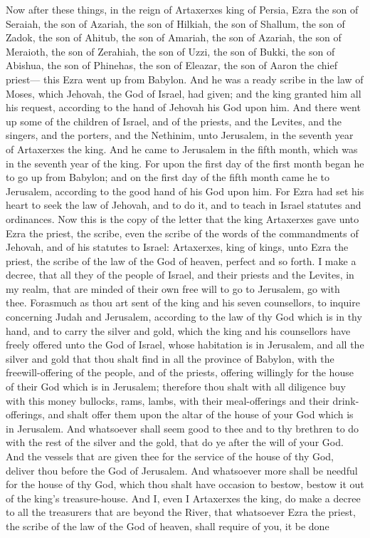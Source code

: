 Now after these things, in the reign of Artaxerxes king of Persia, Ezra the son of Seraiah, the son of Azariah, the son of Hilkiah, the son of Shallum, the son of Zadok, the son of Ahitub, the son of Amariah, the son of Azariah, the son of Meraioth, the son of Zerahiah, the son of Uzzi, the son of Bukki, the son of Abishua, the son of Phinehas, the son of Eleazar, the son of Aaron the chief priest— this Ezra went up from Babylon. And he was a ready scribe in the law of Moses, which Jehovah, the God of Israel, had given; and the king granted him all his request, according to the hand of Jehovah his God upon him. And there went up some of the children of Israel, and of the priests, and the Levites, and the singers, and the porters, and the Nethinim, unto Jerusalem, in the seventh year of Artaxerxes the king. And he came to Jerusalem in the fifth month, which was in the seventh year of the king. For upon the first day of the first month began he to go up from Babylon; and on the first day of the fifth month came he to Jerusalem, according to the good hand of his God upon him. For Ezra had set his heart to seek the law of Jehovah, and to do it, and to teach in Israel statutes and ordinances.  Now this is the copy of the letter that the king Artaxerxes gave unto Ezra the priest, the scribe, even the scribe of the words of the commandments of Jehovah, and of his statutes to Israel: Artaxerxes, king of kings, unto Ezra the priest, the scribe of the law of the God of heaven, perfect and so forth. I make a decree, that all they of the people of Israel, and their priests and the Levites, in my realm, that are minded of their own free will to go to Jerusalem, go with thee. Forasmuch as thou art sent of the king and his seven counsellors, to inquire concerning Judah and Jerusalem, according to the law of thy God which is in thy hand, and to carry the silver and gold, which the king and his counsellors have freely offered unto the God of Israel, whose habitation is in Jerusalem, and all the silver and gold that thou shalt find in all the province of Babylon, with the freewill-offering of the people, and of the priests, offering willingly for the house of their God which is in Jerusalem; therefore thou shalt with all diligence buy with this money bullocks, rams, lambs, with their meal-offerings and their drink-offerings, and shalt offer them upon the altar of the house of your God which is in Jerusalem. And whatsoever shall seem good to thee and to thy brethren to do with the rest of the silver and the gold, that do ye after the will of your God. And the vessels that are given thee for the service of the house of thy God, deliver thou before the God of Jerusalem. And whatsoever more shall be needful for the house of thy God, which thou shalt have occasion to bestow, bestow it out of the king’s treasure-house. And I, even I Artaxerxes the king, do make a decree to all the treasurers that are beyond the River, that whatsoever Ezra the priest, the scribe of the law of the God of heaven, shall require of you, it be done 